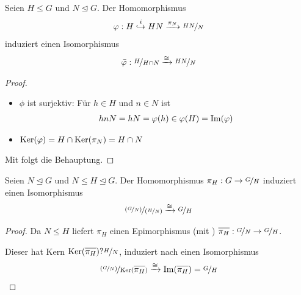\begin{conclusion}[1. Homomorphiesatz]
	Seien $H\le G$ und $N\unlhd G$. Der Homomorphismus
	\begin{align}
		\varphi: H\overset{i}{\hookrightarrow} HN\xrightarrow{\pi_N}\nicefrac{HN}{N}\notag
	\end{align}
	induziert einen Isomorphismus
	\begin{align}
		\overline{\phi}:\lnkset{H}{H\cap N}\xrightarrow{\cong}\lnkset{HN}{N}\notag
	\end{align}
\end{conclusion}
\begin{proof}
	\begin{itemize}
		\item $\phi$ ist surjektiv: Für $h\in H$ und $n\in N$ ist
		\begin{align}
			hnN=hN=\varphi(h)\in\varphi(H)=\operatorname{Im}(\varphi)\notag
		\end{align}
		\item $\operatorname{Ker}(\varphi)=H\cap\operatorname{Ker}(\pi_N)=H\cap N$
	\end{itemize}
	Mit  folgt die Behauptung.
\end{proof}

\begin{conclusion}[2. Homomorphiesatz]
	Seien $N\unlhd G$ und $N\le H\unlhd G$. Der Homomorphismus $\pi_H:G\to\nicefrac{G}{H}$ induziert einen Isomorphismus
	\begin{align}
		\nicefrac{(\nicefrac{G}{N})}{(\nicefrac{H}{N})}\xrightarrow{\cong}\nicefrac{G}{H}\notag
	\end{align}
\end{conclusion}
\begin{proof}
	Da $N\le H$ liefert $\pi_H$ einen Epimorphismus (mit ) $\overline{\pi_H}:\lnkset{G}{N}\to \lnkset{G}{H}$.
	\begin{center}
	\end{center}
	Dieser hat Kern $\Ker(\overline{\pi_H})?\lnkset{H}{N}$, induziert nach  einen Isomorphismus
	\begin{align}
		\lnkset{(\lnkset{G}{N})}{\Ker(\overline{\pi_H})}\xrightarrow{\cong}\Image(\overline{\pi_H})=\lnkset{G}{H}\notag
	\end{align}
\end{proof}

